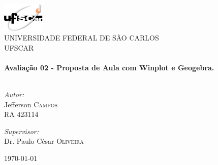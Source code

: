 \begin{titlepage}

\begin{center}

\includegraphics[width=0.15\textwidth]{./ufscar.jpg}\\[1cm]    

\textsc{\LARGE UNIVERSIDADE FEDERAL DE SÃO CARLOS}\\[1.5cm]

\textsc{\Large UFSCAR}\\[0.5cm]

\HRule \\[0.4cm]
{ \huge \bfseries Avaliação 02 - Proposta de Aula com Winplot e Geogebra.}\\[0.4cm]

\HRule \\[1.5cm]


\begin{minipage}{0.4\textwidth}
\begin{flushleft} \large
\emph{Autor:}\\
Jefferson \textsc{Campos}\\
RA 423114\\
\end{flushleft}
\end{minipage}
\begin{minipage}{0.4\textwidth}
\begin{flushright} \large
\emph{Supervisor:} \\
Dr. Paulo César \textsc{Oliveira}
\end{flushright}
\end{minipage}

\vfill

{\large \today}

\end{center}

\end{titlepage}
